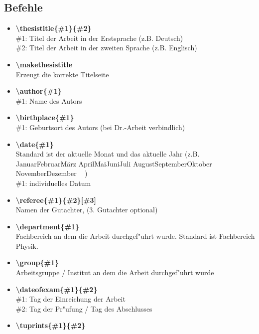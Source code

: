 \documentclass[article,dr=phil,type=drfinal,colorback,accentcolor=tud9c]{tudthesis}
\newcommand{\getmydate}{%
  \ifcase\month%
    \or Januar\or Februar\or M\"arz%
    \or April\or Mai\or Juni\or Juli%
    \or August\or September\or Oktober%
    \or November\or Dezember%
  \fi\ \number\year%
}
\begin{document}
  \subsection{Befehle}
    \begin{itemize}\parsep
      \item \textbf{\textbackslash thesistitle\{\#1\}\{\#2\}}\\
        \#1: Titel der Arbeit in der Erstsprache (z.B. Deutsch)\\
        \#2: Titel der Arbeit in der zweiten Sprache (z.B. Englisch)
      \item \textbf{\textbackslash makethesistitle}\\
        Erzeugt die korrekte Titelseite
      \item \textbf{\textbackslash author\{\#1\}}\\
        \#1: Name des Autors
      \item \textbf{\textbackslash birthplace\{\#1\}}\\
        \#1: Geburtsort des Autors (bei Dr.-Arbeit verbindlich)
      \item \textbf{\textbackslash date\{\#1\}}\\
        Standard ist der aktuelle Monat und das aktuelle Jahr (z.B. \getmydate)\\
        \#1: individuelles Datum
      \item \textbf{\textbackslash referee\{\#1\}\{\#2\}[\#3]}\\
        Namen der Gutachter, (3. Gutachter optional)
      \item \textbf{\textbackslash department\{\#1\}}\\
        Fachbereich an dem die Arbeit durchgef"uhrt wurde. Standard ist
        \glqq Fachbereich Physik\grqq.
      \item \textbf{\textbackslash group\{\#1\}}\\
        Arbeitsgruppe / Institut an dem die Arbeit durchgef"uhrt wurde
      \item \textbf{\textbackslash dateofexam\{\#1\}\{\#2\}}\\
        \#1: Tag der Einreichung der Arbeit\\
        \#2: Tag der Pr"ufung / Tag des Abschlusses\\
      \item \textbf{\textbackslash tuprints\{\#1\}\{\#2\}}\\

\end{itemize}
\end{document}
